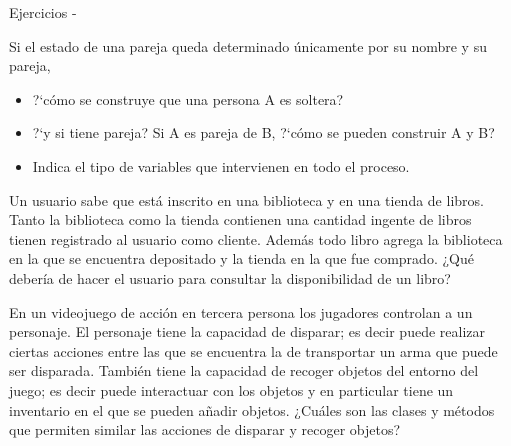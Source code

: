 \documentclass[10pt,envcountsect,spanish]{beamer}
\begin{document}
\begin{frame}[allowframebreaks]{Ejercicios - }
\begin{ejercicio}{}
Si el estado de una pareja queda determinado únicamente por su nombre y su pareja, 

\hfil \begin{minipage}{.6\textwidth}
\begin{itemize}
\item ?`cómo se construye que una persona A es soltera? 
\item ?`y si tiene pareja? Si A es pareja de B, ?`cómo se pueden construir A y B?
\item Indica el tipo de variables que intervienen en todo el proceso.
\end{itemize}
\end{minipage}

\end{ejercicio}





\begin{ejercicio}{}
Un usuario sabe que está inscrito en una biblioteca y en una tienda de libros.
Tanto la biblioteca como la tienda contienen una cantidad ingente de libros tienen registrado al usuario como cliente. Además todo libro agrega la biblioteca en la que se encuentra depositado y la tienda en la que fue comprado. ¿Qué debería de hacer el usuario para consultar la disponibilidad de un libro?
\end{ejercicio}


\begin{ejercicio}{}
En un videojuego de acción en tercera persona  los jugadores controlan a un personaje. El personaje tiene la capacidad de disparar; es decir puede realizar ciertas acciones entre las que se encuentra la de  transportar un arma que puede ser disparada.
También tiene la capacidad de recoger objetos del entorno del juego; es decir puede interactuar con los objetos y en particular tiene un inventario en el que se pueden añadir objetos. ¿Cuáles son las clases y métodos que permiten similar las acciones de disparar y recoger objetos?
\end{ejercicio}



\end{frame}
\end{document}
